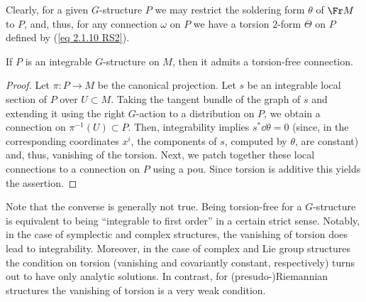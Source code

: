 Clearly, for a given $G$-structure $P$ we may restrict the soldering form $\theta$ of $\Fr M$ to $P$, and, thus, for any connection $\omega$ on $P$ we have a torsion $2$-form $\Theta$ on $P$ defined by (\ref{eq 2.1.10 RS2}).

\begin{prop}[{{\cite[Prop.~2.2.4]{RS2}}}]\label{prop 2.2.4 RS2}
    If $P$ is an integrable $G$-structure on $M$, then it admits a torsion-free connection.
\end{prop}
\begin{proof}
    Let $\pi:P\to M$ be the canonical projection. Let $s$ be an integrable local section of $P$ over $U\subset M$. Taking the tangent bundle of the graph of $s$ and extending it using the right $G$-action to a distribution on $P$, we obtain a connection on $\pi^{-1}(U)\subset P$. Then, integrability implies $s^\ast \dd\theta=0$ (since, in the corresponding coordinates $x^i$, the components of $s$, computed by $\theta$, are constant) and, thus, vanishing of the torsion. Next, we patch together these local connections to a connection on $P$ using a \gls{pou}. Since torsion is additive this yields the assertion.
\end{proof}

\begin{rem}
    Note that the converse is generally not true. Being torsion-free for a $G$-structure is equivalent to being ``integrable to first order'' in a certain strict sense. Notably, in the case of symplectic and complex structures, the vanishing of torsion does lead to integrability. Moreover, in the case of complex and Lie group structures the condition on torsion (vanishing and covariantly constant, respectively) turns out to have only analytic solutions. In contrast, for (presudo-)Riemannian structures the vanishing of torsion is a very weak condition.
\end{rem}

